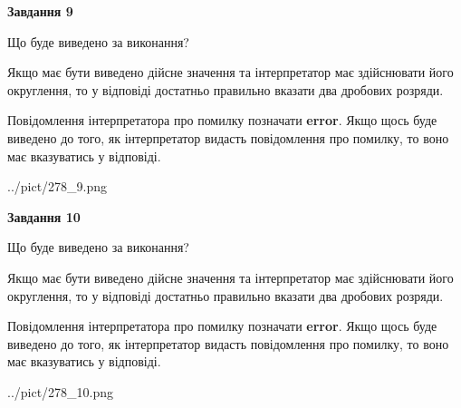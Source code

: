 \documentclass[12pt, ukrainian]{article}
\begin{document}
{\begin {Large}
{\begin {center}\textbf{Завдання 9}\end {center}}\par
Що буде виведено за виконання? \par

Якщо має бути виведено дійсне значення та інтерпретатор має здійснювати його округлення, 
то у відповіді достатньо правильно вказати два дробових розряди.

Повідомлення інтерпретатора про помилку позначати \textbf{error}.
Якщо щось буде виведено до того, як інтерпретатор видасть повідомлення про помилку, 
то воно має вказуватись у відповіді. \par

\begin{center}
	{../pict/278_9.png}
\end{center}
\newpage

{\begin {center}\textbf{Завдання 10}\end {center}}\par
Що буде виведено за виконання? \par

Якщо має бути виведено дійсне значення та інтерпретатор має здійснювати його округлення, 
то у відповіді достатньо правильно вказати два дробових розряди.

Повідомлення інтерпретатора про помилку позначати \textbf{error}.
Якщо щось буде виведено до того, як інтерпретатор видасть повідомлення про помилку, 
то воно має вказуватись у відповіді. \par

\begin{center}
	{../pict/278_10.png}
\end{center}
\newpage

\end {Large}}
\end{document}
